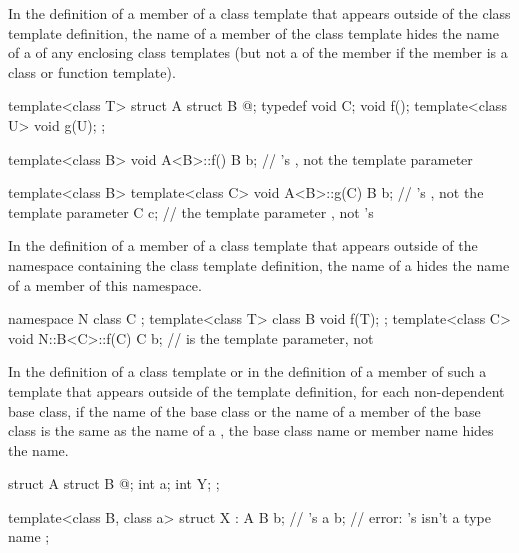 \pnum
In the definition of a member of
a class template that appears outside of the class template definition,
the name of a member of the class template hides the name of a
of any enclosing class templates (but not a  of the
member if the member is a class or function template).
\begin{example}
\begin{codeblock}
template<class T> struct A {
  struct B { @\commentellip@ };
  typedef void C;
  void f();
  template<class U> void g(U);
};

template<class B> void A<B>::f() {
  B b;              // 's , not the template parameter
}

template<class B> template<class C> void A<B>::g(C) {
  B b;              // 's , not the template parameter
  C c;              // the template parameter , not 's 
}
\end{codeblock}
\end{example}

\pnum
In the definition of a member of a class template that appears outside of the
namespace containing the class template definition,
the name of a
hides the name of a member of this namespace.
\begin{example}
\begin{codeblock}
namespace N {
  class C { };
  template<class T> class B {
    void f(T);
  };
}
template<class C> void N::B<C>::f(C) {
  C b;              //  is the template parameter, not 
}
\end{codeblock}
\end{example}

\pnum
In the definition of a class template or in the definition of a member of such
a template that appears outside of the template definition,
for each non-dependent base class,
if the name of the base class
or the name of a member of the
base class is the same as the name of a
,
the base class name or member name hides the
name.
\begin{example}
\begin{codeblock}
struct A {
  struct B { @\commentellip@ };
  int a;
  int Y;
};

template<class B, class a> struct X : A {
  B b;              // 's 
  a b;              // error: 's  isn't a type name
};
\end{codeblock}
\end{example}

